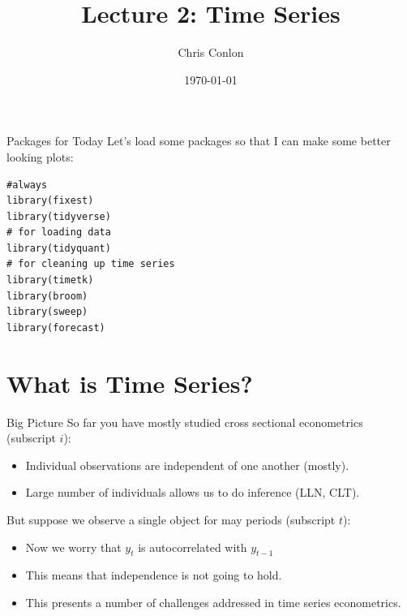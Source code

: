 

\title{Lecture 2: Time Series}
\author{Chris Conlon }
\date{\today}


\maketitle

\begin{frame}[fragile]{Packages for Today}
Let's load some packages so that I can make some better looking plots:\\
\begin{verbatim}
#always
library(fixest)
library(tidyverse)
# for loading data
library(tidyquant)
# for cleaning up time series
library(timetk)
library(broom)
library(sweep)
library(forecast)

\end{verbatim}
\end{frame}

\section{What is Time Series?}


\begin{frame}{Big Picture}
So far you have mostly studied \alert{cross sectional econometrics} (subscript $i$):
\begin{itemize}
\item Individual observations are \alert{independent} of one another (mostly).
\item Large number of individuals allows us to do inference (LLN, CLT).
\end{itemize}
\vspace{1cm}
But suppose we observe a single object for may periods (subscript $t$):
\begin{itemize}
\item Now we worry that $y_{t}$ is \alert{autocorrelated} with $y_{t-1}$
\item This means that \alert{independence} is not going to hold.
\item This presents a number of challenges addressed in time series econometrics.
\end{itemize}
\end{frame}

